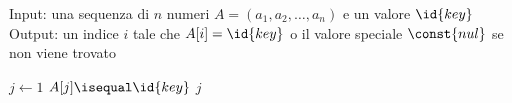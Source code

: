 Input: una sequenza di $n$ numeri $A = (a_1,a_2,\dots,a_n)$ e un valore $\id{key}$
Output: un indice $i$ tale che $A[i] = \id{key}$ o il valore speciale $\const{nul}$ se non viene trovato

\begin{codebox}
\li \For $j \gets 1$ \To {}
    \Do
\li       \If $A[j] \isequal \id{key}$
          \Then
\li               \Return $j$
          \End
    \End
\li \Return {}
\end{codebox}
